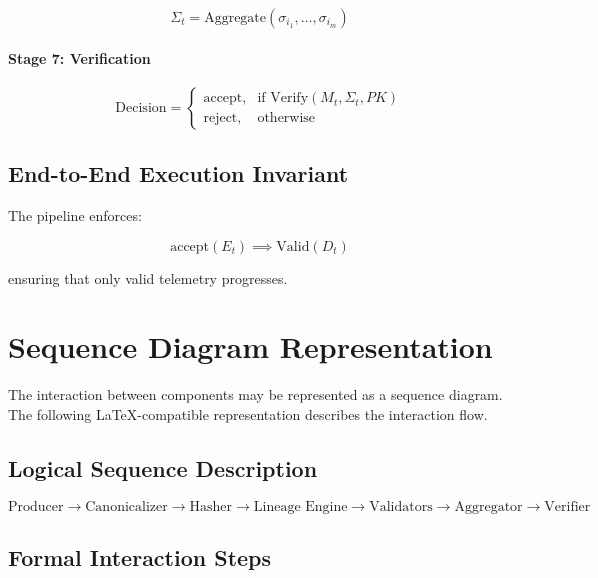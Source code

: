 \begin{equation}
\Sigma_t = \text{Aggregate}(\sigma_{i_1}, \dots, \sigma_{i_m})
\end{equation}

\paragraph{Stage 7: Verification}

\begin{equation}
\text{Decision} =
\begin{cases}
\text{accept}, & \text{if } \text{Verify}(M_t, \Sigma_t, PK) \\
\text{reject}, & \text{otherwise}
\end{cases}
\end{equation}

\subsection{End-to-End Execution Invariant}

The pipeline enforces:

\begin{equation}
\text{accept}(E_t) \implies \text{Valid}(D_t)
\end{equation}

ensuring that only valid telemetry progresses.

\section{Sequence Diagram Representation}

The interaction between components may be represented as a sequence diagram. The following LaTeX-compatible representation describes the interaction flow.

\subsection{Logical Sequence Description}

\begin{equation}
\text{Producer} \rightarrow \text{Canonicalizer} \rightarrow \text{Hasher} \rightarrow \text{Lineage Engine} \rightarrow \text{Validators} \rightarrow \text{Aggregator} \rightarrow \text{Verifier}
\end{equation}

\subsection{Formal Interaction Steps}

